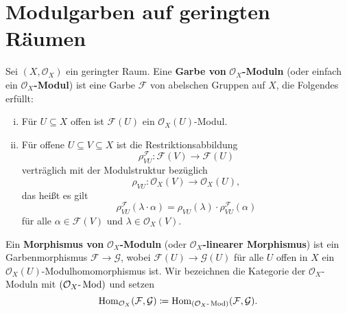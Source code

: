 \chapter{Modulgarben auf geringten Räumen}

\begin{defn}
	Sei $(X,\mathcal{O}_X)$ ein geringter Raum. Eine \textbf{Garbe von} $\mathcal{O}_X$\textbf{-Moduln} (oder einfach ein $\mathcal{O}_X$\textbf{-Modul}) ist eine Garbe $\mathcal{F}$ von abelschen Gruppen auf $X$, die Folgendes erfüllt:
	\begin{enumerate}[i)]
		\item Für $U \subseteq X$ offen ist $\mathcal{F}(U)$ ein $\mathcal{O}_X(U)$-Modul.
		\item Für offene $U \subseteq V \subseteq X$ ist die Restriktionsabbildung
		\[
			\rho_{VU}^{\mathcal{F}}\colon \mathcal{F}(V) \to \mathcal{F}(U)
		\]
		verträglich mit der Modulstruktur bezüglich
		\[
			\rho_{VU}\colon \mathcal{O}_X(V) \to \mathcal{O}_X(U),
		\]
		das heißt es gilt
		\[
			\rho_{VU}^\mathcal{F}(\lambda \cdot \alpha) = \rho_{VU}(\lambda) \cdot \rho_{VU}^\mathcal{F}(\alpha)
		\]
		für alle $\alpha \in \mathcal{F}(V)$ und $\lambda \in \mathcal{O}_X(V)$.
	\end{enumerate}
	Ein \textbf{Morphismus von} $\mathcal{O}_X$\textbf{-Moduln} (oder $\mathcal{O}_X$\textbf{-linearer Morphismus}) ist ein Garbenmorphismus $\mathcal{F}\to \mathcal{G}$, wobei $\mathcal{F}(U) \to \mathcal{G}(U)$ für alle $U$ offen in $X$ ein $\mathcal{O}_X(U)$-Modulhomomorphismus ist. Wir bezeichnen die Kategorie  der $\mathcal{O}_X$-Moduln mit $(\mathcal{O}_X\text{-}\operatorname{Mod})$ und setzen
	\[
		\operatorname{Hom}_{\mathcal{O}_X}(\mathcal{F},\mathcal{G}) \coloneqq \operatorname{Hom}_{(\mathcal{O}_X\text{-}\operatorname{Mod})}(\mathcal{F},\mathcal{G}).
	\]
\end{defn}

